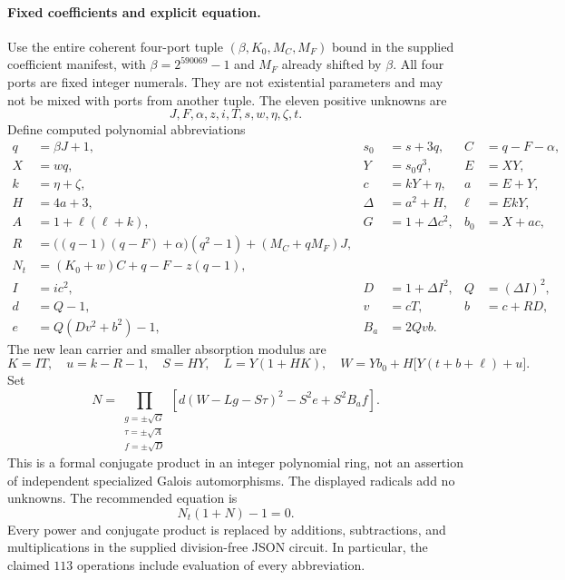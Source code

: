\paragraph{Fixed coefficients and explicit equation.}
Use the entire coherent four-port tuple $(\beta,K_0,M_C,M_F)$ bound in the
supplied coefficient manifest, with $\beta=2^{590069}-1$ and $M_F$ already
shifted by $\beta$. All four ports are fixed integer numerals. They are not
existential parameters and may not be mixed with ports from another tuple.
The eleven positive unknowns are
\[
 J,F,\alpha,z,i,T,s,w,\eta,\zeta,t.
\]
Define computed polynomial abbreviations
\begin{align*}
q&=\beta J+1,&s_0&=s+3q,& C&=q-F-\alpha,\\
X&=wq,&Y&=s_0q^3,&E&=XY,\\
k&=\eta+\zeta,&c&=kY+\eta,&a&=E+Y,\\
H&=4a+3,&\Delta&=a^2+H,&\ell&=EkY,\\
A&=1+\ell(\ell+k),&G&=1+\Delta c^2,&b_0&=X+ac,\\
R&=\bigl((q-1)(q-F)+\alpha\bigr)(q^2-1)+(M_C+qM_F)J,\\
N_t&=(K_0+w)C+q-F-z(q-1),\\
I&=ic^2,&D&=1+\Delta I^2,&Q&=(\Delta I)^2,\\
d&=Q-1,&v&=cT,&b&=c+RD,\\
e&=Q(Dv^2+b^2)-1,&B_a&=2Qvb.&&
\end{align*}
The new lean carrier and smaller absorption modulus are
\[
 K=IT,\quad u=k-R-1,\quad S=HY,\quad
 L=Y(1+HK),\quad W=Yb_0+H\bigl[Y(t+b+\ell)+u\bigr].
\]
Set
\[
 N=\prod_{\substack{g=\pm\sqrt G\\ \tau=\pm\sqrt A\\ f=\pm\sqrt D}}
 \left[d(W-Lg-S\tau)^2-S^2e+S^2B_af\right].
\]
This is a formal conjugate product in an integer polynomial ring, not an
assertion of independent specialized Galois automorphisms. The displayed
radicals add no unknowns. The recommended equation is
\[
 \boxed{\ N_t(1+N)-1=0.\ }
\]
Every power and conjugate product is replaced by additions, subtractions,
and multiplications in the supplied division-free JSON circuit. In particular,
the claimed $113$ operations include evaluation of every abbreviation.

